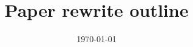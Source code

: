 \documentclass[aps,prd,reprint,groupedaddress]{revtex4-2}
\begin{document}

\title{Paper rewrite outline}


\author{}
\affiliation{}


\date{\today}

\begin{abstract}
\end{abstract}


\maketitle

\section{}
\end{document}
